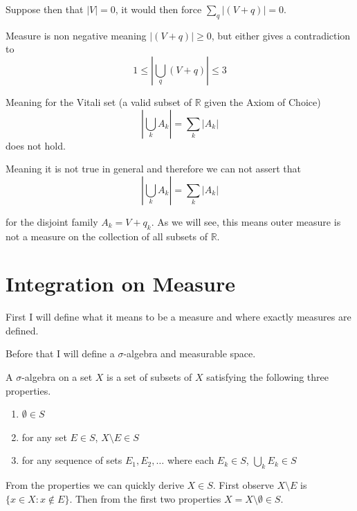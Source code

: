 \documentclass[12pt]{article}
\theoremstyle{plain}
\theoremstyle{definition}
\theoremstyle{definition}
\theoremstyle{remark}
\begin{document}
Suppose then that $|V| = 0$, it would then force $\sum_q |(V + q)| = 0$.

Measure is non negative meaning $|(V + q)| \geq 0$, but either gives a contradiction to
\begin{equation}
    1 \leq |\bigcup_q (V + q)| \leq 3
\end{equation}

Meaning for the Vitali set (a valid subset of $\mathbb{R}$ given the Axiom of Choice)
\begin{equation}
    |\bigcup_k A_k| = \sum_k |A_k|
\end{equation}
does not hold.

Meaning it is not true in general and therefore we can not assert that
\begin{equation}
    |\bigcup_k A_k| = \sum_k |A_k|
\end{equation}

for the disjoint family $A_k = V + q_k$. As we will see, this means outer measure is not a
measure on the collection of all subsets of $\mathbb{R}$.


\section{Integration on Measure}

First I will define what it means to be a measure and where exactly
measures are defined.

Before that I will define a $\sigma$-algebra and measurable space.

\begin{definition}
    A $\sigma$-algebra on a set $X$ is a set of subsets of $X$ satisfying the
    following three properties.

    \begin{enumerate}
        \item $\emptyset \in S$
        \item for any set $E \in S$, $X \setminus E \in S$
        \item for any sequence of sets $E_1, E_2, \ldots$ where each $E_k \in S$, $\bigcup_k E_k \in S$
    \end{enumerate}
\end{definition}

From the properties we can quickly derive $X \in S$. First observe
$X \setminus E$ is $\{x \in X: x \not\in E\}$. Then from the first two properties
$X = X \setminus \emptyset \in S$.
\end{document}
